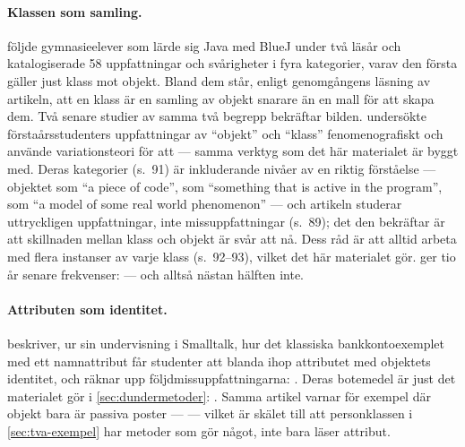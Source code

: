 \paragraph{Klassen som samling.}  \Textcite{Ragonis2005OOP} följde
gymnasieelever som lärde sig Java med BlueJ under två läsår och
katalogiserade 58 uppfattningar och svårigheter i fyra kategorier, varav
den första gäller just klass mot objekt.  Bland dem står, enligt
genomgångens läsning av artikeln, att en klass är en samling av objekt
snarare än en mall för att skapa dem.  Två senare studier av samma två
begrepp bekräftar bilden.  \Textcite{EckerdalThune2005} undersökte
förstaårsstudenters uppfattningar av \enquote{objekt} och \enquote{klass}
fenomenografiskt och använde variationsteori för att
 --- samma verktyg som det här materialet är byggt med.
Deras kategorier (s.~91) är inkluderande nivåer av en riktig förståelse
--- objektet som \enquote{a piece of code}, som \enquote{something that
is active in the program}, som \enquote{a model of some real world
phenomenon} --- och artikeln studerar uttryckligen uppfattningar, inte
missuppfattningar (s.~89); det den bekräftar är att skillnaden mellan
klass och objekt är svår att nå.  Dess råd är att alltid arbeta med flera
instanser av varje klass (s.~92--93), vilket det här materialet gör.
\Textcite{Xinogalos2015} ger tio år senare frekvenser:
 --- och alltså nästan hälften
inte.

\paragraph{Attributen som identitet.}  \Textcite{Holland1997} beskriver,
ur sin undervisning i Smalltalk, hur det klassiska bankkontoexemplet med
ett namnattribut får studenter att blanda ihop attributet med objektets
identitet, och räknar upp följdmissuppfattningarna:
.  Deras botemedel är just
det materialet gör i \cref{sec:dundermetoder}: .  Samma artikel varnar för
exempel där objekt bara är passiva poster ---
 --- vilket är skälet till att
personklassen i \cref{sec:tva-exempel} har metoder som gör något, inte
bara läser attribut.


